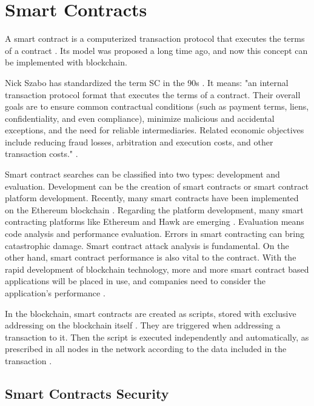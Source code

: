 \section{Smart Contracts}\label{sec:smartContracts}

A smart contract is a computerized transaction protocol that executes the terms of a contract \cite{szabo1997idea}. Its model was proposed a long time ago, and now this concept can be implemented with blockchain.

Nick Szabo has standardized the term \acf{SC} in the 90s \cite{greve2018blockchain}. It means: "an internal transaction protocol format that executes the terms of a contract. Their overall goals are to ensure common contractual conditions (such as payment terms, liens, confidentiality, and even compliance), minimize malicious and accidental exceptions, and the need for reliable intermediaries. Related economic objectives include reducing fraud losses, arbitration and execution costs, and other transaction costs." \cite{szabo1997idea}.

Smart contract searches can be classified into two types: development and evaluation. Development can be the creation of smart contracts or smart contract platform development. Recently, many smart contracts have been implemented on the Ethereum blockchain \cite{wood2018secure}. Regarding the platform development, many smart contracting platforms like Ethereum \cite{wood2018secure} and Hawk \cite{kosbaa2016theblockchain} are emerging \cite{zheng2016blockchain}. Evaluation means code analysis and performance evaluation. Errors in smart contracting can bring catastrophic damage. Smart contract attack analysis is fundamental. On the other hand, smart contract performance is also vital to the contract. With the rapid development of blockchain technology, more and more smart contract based applications will be placed in use, and companies need to consider the application's performance \cite{zheng2016blockchain}.

In the blockchain, smart contracts are created as scripts, stored with exclusive addressing on the blockchain itself \cite{greve2018blockchain}. They are triggered when addressing a transaction to it. Then the script is executed independently and automatically, as prescribed in all nodes in the network according to the data included in the transaction \cite{christidis2016blockchains}.

\subsection{Smart Contracts Security}\label{sec:seguranca}

